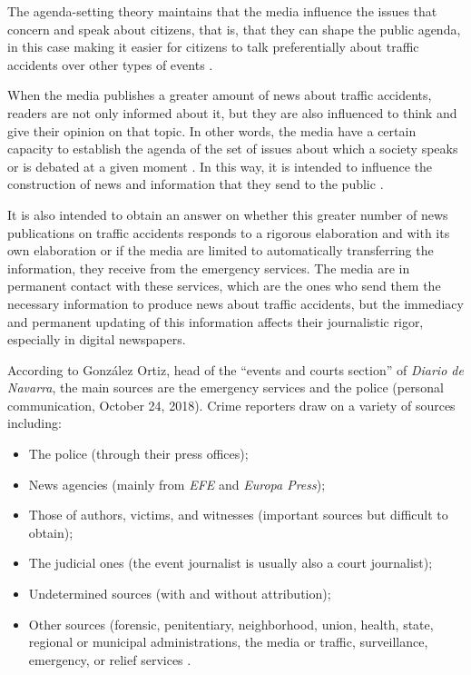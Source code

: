 The agenda-setting theory maintains that the media influence the issues
that concern and speak about citizens, that is, that they can shape the
public agenda, in this case making it easier for citizens to talk
preferentially about traffic accidents over other types of events
\cite{scheufele2007framing}.

When the media publishes a greater amount of news about traffic
accidents, readers are not only informed about it, but they are also
influenced to think and give their opinion on that topic. In other
words, the media have a certain capacity to establish the agenda of the
set of issues about which a society speaks or is debated at a given
moment \cite{mccombs1972agenda}. In this way, it is intended to influence
the construction of news and information that they send to the public
\cite{vos2015how}.

It is also intended to obtain an answer on whether this greater number
of news publications on traffic accidents responds to a rigorous
elaboration and with its own elaboration or if the media are limited to
automatically transferring the information, they receive from the
emergency services. The media are in permanent contact with these
services, which are the ones who send them the necessary information to
produce news about traffic accidents, but the immediacy and permanent
updating of this information affects their journalistic rigor,
especially in digital newspapers.

According to González Ortiz, head of the \enquote{events and courts section} of
\emph{Diario de Navarra}, the main sources are the emergency services
and the police (personal communication, October 24, 2018). Crime
reporters draw on a variety of sources including:
\begin{itemize}
	
\item The police (through their press offices);
\item News agencies (mainly from \emph{EFE} and \emph{Europa Press});
\item Those of authors, victims, and witnesses (important sources but
difficult to obtain);
\item The judicial ones (the event journalist is usually also a court
journalist);
\item Undetermined sources (with and without attribution);
\item Other sources (forensic, penitentiary, neighborhood, union, health,
state, regional or municipal administrations, the media or traffic,
surveillance, emergency, or relief services \cite{rodriguez2015manual}.
\end{itemize}

